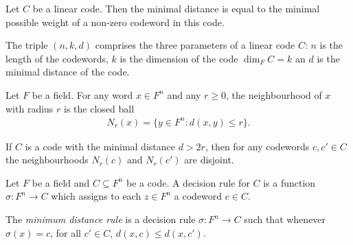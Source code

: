 \documentclass{article}
\begin{document}
\begin{lemma}[Lecture 10]
    Let $C$ be a linear code. Then the minimal distance is equal to the minimal possible weight 
    of a non-zero codeword in this code.
\end{lemma}

\begin{definition}[Lecture 10]
    The triple $(n,k,d)$ comprises the three parameters of a linear code $C$: $n$ is the length of the 
    codewords, $k$ is the dimension of the code $\dim_F C=k$ an $d$ is the minimal distance of the code.
\end{definition}

\begin{definition}[Lecture 10]
    Let $F$ be a field. For any word $x\in F^n$ and any $r\geq 0$, the neighbourhood of $x$ with radius 
    $r$ is the closed ball 
    \begin{align*}
        N_r(x)=\{y\in F^n : d(x,y)\leq r\}. 
    \end{align*}
\end{definition}

\begin{lemma}[Lecture 10]
    If $C$ is a code with the minimal distance $d>2r$, then for any codewords $c,c'\in C$ the neighbourhoods
    $N_r(c)$ and $N_r(c')$ are disjoint. 
\end{lemma}

\begin{definition}[Lecture 10]
    Let $F$ be a field and $C\subseteq F^n$ be a code. A decision rule for $C$ is a function 
    $\sigma:F^n\to C$ which assigns to each $z\in F^n$ a codeword $c\in C$.
\end{definition}

\begin{definition}
    The \emph{minimum distance rule} is a decision rule $\sigma:F^n\to C$ such that 
    whenever $\sigma(x)=c$, for all $c'\in C$, $d(x,c) \leq d(x,c')$.
\end{definition}
\end{document}
